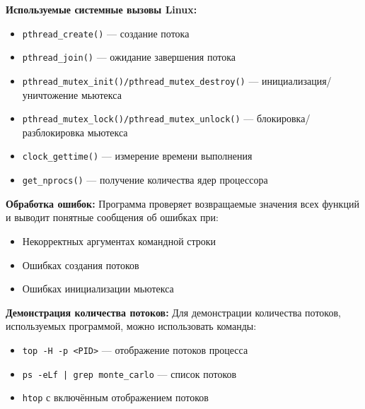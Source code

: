 {\bfseries Используемые системные вызовы Linux:}
\begin{itemize}
    \item \texttt{pthread\_create()} — создание потока
    \item \texttt{pthread\_join()} — ожидание завершения потока
    \item \texttt{pthread\_mutex\_init()/pthread\_mutex\_destroy()} — инициализация/уничтожение мьютекса
    \item \texttt{pthread\_mutex\_lock()/pthread\_mutex\_unlock()} — блокировка/разблокировка мьютекса
    \item \texttt{clock\_gettime()} — измерение времени выполнения
    \item \texttt{get\_nprocs()} — получение количества ядер процессора
\end{itemize}

{\bfseries Обработка ошибок:}
Программа проверяет возвращаемые значения всех функций и выводит понятные сообщения об ошибках при:
\begin{itemize}
    \item Некорректных аргументах командной строки
    \item Ошибках создания потоков
    \item Ошибках инициализации мьютекса
\end{itemize}

{\bfseries Демонстрация количества потоков:}
Для демонстрации количества потоков, используемых программой, можно использовать команды:
\begin{itemize}
    \item \texttt{top -H -p <PID>} — отображение потоков процесса
    \item \texttt{ps -eLf | grep monte\_carlo} — список потоков
    \item \texttt{htop} с включённым отображением потоков
\end{itemize}